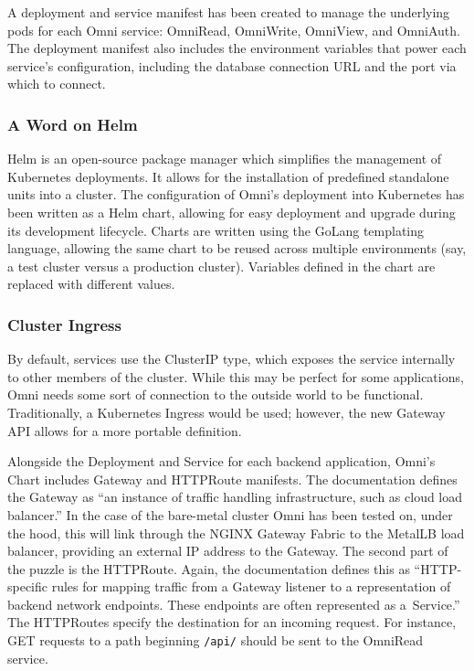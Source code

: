 A deployment and service manifest has been created to manage the underlying pods for each Omni service: OmniRead, OmniWrite, OmniView, and OmniAuth.
The deployment manifest also includes the environment variables that power each service's configuration, including the database connection URL and the port via which to connect.

\subsubsection{A Word on Helm}
Helm is an open-source package manager which simplifies the management of Kubernetes deployments. It allows for the installation of predefined standalone units into a cluster. 
The configuration of Omni's deployment into Kubernetes has been written as a Helm chart, allowing for easy deployment and upgrade during its development lifecycle. 
Charts are written using the GoLang templating language, allowing the same chart to be reused across multiple environments (say, a test cluster versus a production cluster).
Variables defined in the chart are replaced with different values.

\subsubsection{Cluster Ingress}
By default, services use the ClusterIP type, which exposes the service internally to other members of the cluster.
While this may be perfect for some applications, Omni needs some sort of connection to the outside world to be functional.
Traditionally, a Kubernetes Ingress would be used; however, the new Gateway API allows for a more portable definition. 

Alongside the Deployment and Service for each backend application, Omni's Chart includes Gateway and HTTPRoute manifests.
The documentation defines the Gateway as ``an instance of traffic handling infrastructure, such as cloud load balancer.''
In the case of the bare-metal cluster Omni has been tested on, under the hood, this will link through the NGINX Gateway Fabric to the MetalLB load balancer, providing an external IP address to the Gateway. 
The second part of the puzzle is the HTTPRoute. Again, the documentation defines this as ``HTTP-specific rules for mapping traffic from a Gateway listener to a representation of backend network endpoints. These endpoints are often represented as a Service.''
The HTTPRoutes specify the destination for an incoming request. 
For instance, GET requests to a path beginning \verb|/api/| should be sent to the OmniRead service. 

